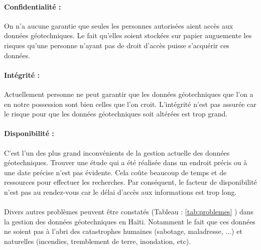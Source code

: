 \paragraph{Confidentialité : }
On n'a aucune garantie que seules les personnes autorisées 
aient accès aux données géotechniques. Le fait qu'elles soient
stockées sur papier auguemente les risques qu'une personne
n'ayant pas de droit d'accès puisse s'acquérir ces données.
\paragraph{Intégrité : }
Actuellement personne ne peut
garantir que les données géotechniques que l'on a en notre possession 
sont bien celles que l’on croit. L'intégrité n'est pas assurée car le risque
pour que les données géotechniques soit altérées est trop grand.
\paragraph{Disponibilité :}
C'est l'un des plus grand inconvénients de la gestion actuelle des 
données géotechniques. Trouver une étude qui a été réalisée dans un endroit précis
ou à une date précise n'est pas évidente. Cela coûte beaucoup de temps et de ressources 
pour effectuer
les recherches. Par conséquent, le facteur de disponibilité n'est pas 
au rendez-vous car le délai d'accès aux informations est trop long.

\paragraph{}
Divers autres problèmes peuvent être constatés (Tableau : \ref{tab:problemes} )  dans la gestion
des données géotechniques en Haïti. Notamment le fait que ces données
ne soient pas à l'abri des catastrophes humaines (sabotage, maladresse, ...) et naturelles
(incendies, tremblement de terre, inondation, etc).


